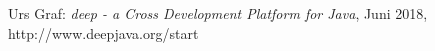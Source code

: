 \begingroup
\renewcommand{\chapter}[2]{\section#1{#2}}%
\begin{thebibliography}{99}


	Urs Graf:
	\emph{deep - a Cross Development Platform for Java},
	Juni 2018, http://www.deepjava.org/start






	\end{thebibliography}
\endgroup